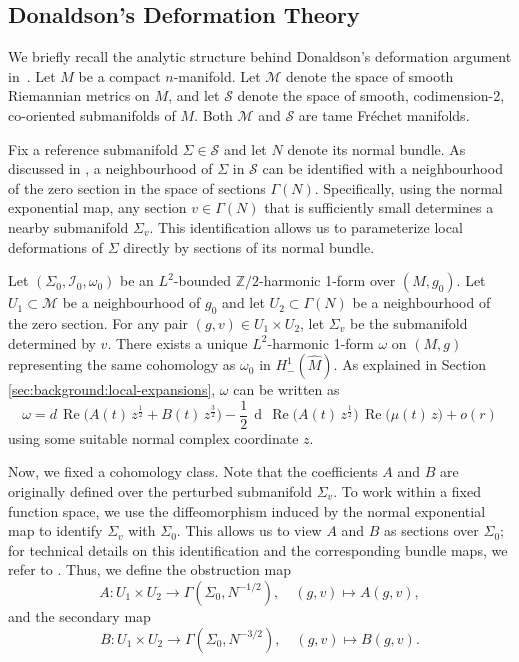 \documentclass[11pt]{amsart}
\newcommand{\ZT}{\mathbb{Z}/2}
\renewcommand{\d}{\operatorname{d}}
\renewcommand{\Re}{\operatorname{Re}}
\begin{document}
\subsection{Donaldson's Deformation Theory}

We briefly recall the analytic structure behind Donaldson's deformation argument in~\cite{Donaldson2021}. Let $M$ be a compact $n$-manifold. Let $\mathcal{M}$ denote the space of smooth Riemannian metrics on $M$, and let $\mathcal{S}$ denote the space of smooth, codimension-2, co-oriented submanifolds of $M$. Both $\mathcal{M}$ and $\mathcal{S}$ are tame Fréchet manifolds.

Fix a reference submanifold $\Sigma \in \mathcal{S}$ and let $N$ denote its normal bundle. As discussed in \cite[Section 4]{Donaldson2021}, a neighbourhood of $\Sigma$ in $\mathcal{S}$ can be identified with a neighbourhood of the zero section in the space of sections $\Gamma(N)$. Specifically, using the normal exponential map, any section $v \in \Gamma(N)$ that is sufficiently small determines a nearby submanifold $\Sigma_v$. This identification allows us to parameterize local deformations of $\Sigma$ directly by sections of its normal bundle.

Let $(\Sigma_0, \mathcal{I}_0, \omega_0)$ be an $L^2$-bounded $\ZT$-harmonic 1-form over $(M, g_0)$. Let $U_1 \subset \mathcal{M}$ be a neighbourhood of $g_0$ and let $U_2 \subset \Gamma(N)$ be a neighbourhood of the zero section.
For any pair $(g, v) \in U_1 \times U_2$, let $\Sigma_v$ be the submanifold determined by $v$. There exists a unique $L^2$-harmonic 1-form $\omega$ on $(M, g)$ representing the same cohomology as $\omega_0$ in $H^1_-(\widehat{M})$. As explained in Section \ref{sec:background:local-expansions}, $\omega$ can be written as
\begin{equation}
	\label{eq:expansion}
	\omega
	= d\,\Re\bigl(A(t)\,z^{\frac12}+B(t)\,z^{\frac32}\bigr)
	-\frac12\, \d\,\Re\bigl(A(t)\,z^{\frac12}\bigr)\,\Re\bigl(\mu(t)\,z\bigr)
	+ o(r)
\end{equation}
using some suitable normal complex coordinate $z$.

Now, we fixed a cohomology class. Note that the coefficients $A$ and $B$ are originally defined over the perturbed submanifold $\Sigma_v$. To work within a fixed function space, we use the diffeomorphism induced by the normal exponential map to identify $\Sigma_v$ with $\Sigma_0$. This allows us to view $A$ and $B$ as sections over $\Sigma_0$; for technical details on this identification and the corresponding bundle maps, we refer to \cite[Section 4]{Donaldson2021}. Thus, we define the obstruction map
\[
A: U_1 \times U_2 \to \Gamma(\Sigma_0, N^{-1/2}), \quad (g, v) \mapsto A(g, v),
\]
and the secondary map
\[
B: U_1 \times U_2 \to \Gamma(\Sigma_0, N^{-3/2}), \quad (g, v) \mapsto B(g, v).
\]
\end{document}
